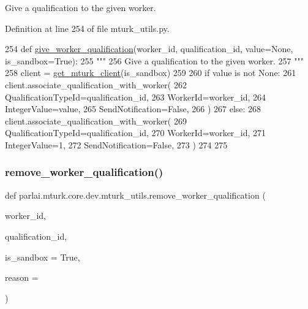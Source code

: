 \begin{DoxyVerb}Give a qualification to the given worker.
\end{DoxyVerb}
 

Definition at line 254 of file mturk\+\_\+utils.\+py.


\begin{DoxyCode}
254 \textcolor{keyword}{def }\hyperlink{namespaceparlai_1_1mturk_1_1core_1_1mturk__utils_a640e2d9d121507f92649cccbd27e3af9}{give\_worker\_qualification}(worker\_id, qualification\_id, value=None, 
      is\_sandbox=True):
255     \textcolor{stringliteral}{"""}
256 \textcolor{stringliteral}{    Give a qualification to the given worker.}
257 \textcolor{stringliteral}{    """}
258     client = \hyperlink{namespaceparlai_1_1mturk_1_1core_1_1mturk__utils_a577e2527c04682284394b0951a090695}{get\_mturk\_client}(is\_sandbox)
259 
260     \textcolor{keywordflow}{if} value \textcolor{keywordflow}{is} \textcolor{keywordflow}{not} \textcolor{keywordtype}{None}:
261         client.associate\_qualification\_with\_worker(
262             QualificationTypeId=qualification\_id,
263             WorkerId=worker\_id,
264             IntegerValue=value,
265             SendNotification=\textcolor{keyword}{False},
266         )
267     \textcolor{keywordflow}{else}:
268         client.associate\_qualification\_with\_worker(
269             QualificationTypeId=qualification\_id,
270             WorkerId=worker\_id,
271             IntegerValue=1,
272             SendNotification=\textcolor{keyword}{False},
273         )
274 
275 
\end{DoxyCode}
\mbox{\label{namespaceparlai_1_1mturk_1_1core_1_1dev_1_1mturk__utils_abc2c057b91641179f7c4bb50dd916488}} 
\subsubsection{\texorpdfstring{remove\+\_\+worker\+\_\+qualification()}{remove\_worker\_qualification()}}
{\footnotesize\ttfamily def parlai.\+mturk.\+core.\+dev.\+mturk\+\_\+utils.\+remove\+\_\+worker\+\_\+qualification (\begin{DoxyParamCaption}\item[{}]{worker\+\_\+id,  }\item[{}]{qualification\+\_\+id,  }\item[{}]{is\+\_\+sandbox = {\ttfamily True},  }\item[{}]{reason = {\ttfamily \textquotesingle{}\textquotesingle{}} }\end{DoxyParamCaption})}

